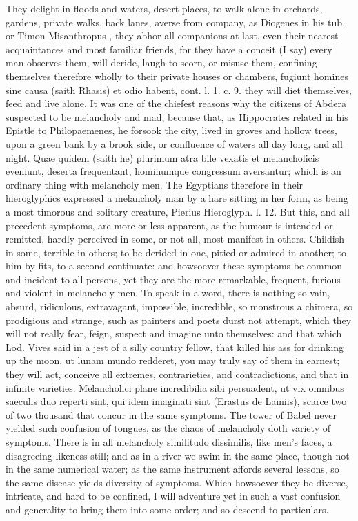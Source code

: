 {They delight in floods and waters, desert places, to walk alone in
orchards, gardens, private walks, back lanes, averse from company, as
Diogenes in his tub, or Timon Misanthropus , they abhor all
companions at last, even their nearest acquaintances and most familiar
friends, for they have a conceit (I say) every man observes them, will
deride, laugh to scorn, or misuse them, confining themselves therefore
wholly to their private houses or chambers, fugiunt homines sine causa
(saith Rhasis) et odio habent, cont. l. 1. c. 9. they will diet
themselves, feed and live alone. It was one of the chiefest reasons why
the citizens of Abdera suspected \Democritus{} to be melancholy and mad,
because that, as Hippocrates related in his Epistle to Philopaemenes,
he forsook the city, lived in groves and hollow trees, upon a
green bank by a brook side, or confluence of waters all day long, and
all night. Quae quidem (saith he) plurimum atra bile vexatis et
melancholicis eveniunt, deserta frequentant, hominumque congressum
aversantur; which is an ordinary thing with melancholy men. The
Egyptians therefore in their hieroglyphics expressed a melancholy man
by a hare sitting in her form, as being a most timorous and solitary
creature, Pierius Hieroglyph. l. 12. But this, and all precedent
symptoms, are more or less apparent, as the humour is intended or
remitted, hardly perceived in some, or not all, most manifest in
others. Childish in some, terrible in others; to be derided in one,
pitied or admired in another; to him by fits, to a second continuate:
and howsoever these symptoms be common and incident to all persons, yet
they are the more remarkable, frequent, furious and violent in
melancholy men. To speak in a word, there is nothing so vain, absurd,
ridiculous, extravagant, impossible, incredible, so monstrous a
chimera, so prodigious and strange, such as painters and poets
durst not attempt, which they will not really fear, feign, suspect and
imagine unto themselves: and that which Lod. Vives said in a jest
of a silly country fellow, that killed his ass for drinking up the
moon, ut lunam mundo redderet, you may truly say of them in earnest;
they will act, conceive all extremes, contrarieties, and
contradictions, and that in infinite varieties. Melancholici plane
incredibilia sibi persuadent, ut vix omnibus saeculis duo reperti sint,
qui idem imaginati sint (Erastus de Lamiis), scarce two of two thousand
that concur in the same symptoms. The tower of Babel never yielded such
confusion of tongues, as the chaos of melancholy doth variety of
symptoms. There is in all melancholy similitudo dissimilis, like men's
faces, a disagreeing likeness still; and as in a river we swim in the
same place, though not in the same numerical water; as the same
instrument affords several lessons, so the same disease yields
diversity of symptoms. Which howsoever they be diverse, intricate, and
hard to be confined, I will adventure yet in such a vast confusion and
generality to bring them into some order; and so descend to
particulars.

}
